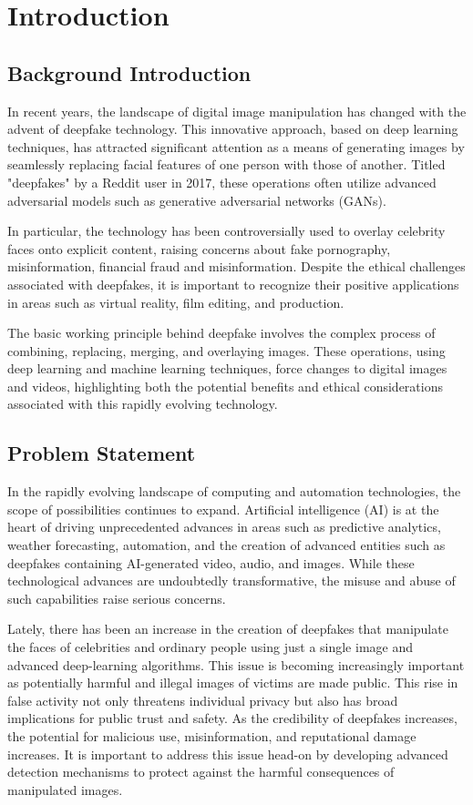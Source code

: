      \chapter{Introduction}
        \section{Background Introduction}
        In recent years, the landscape of digital image manipulation has changed with the advent of deepfake technology.
        This innovative approach, based on deep learning techniques, has attracted significant attention as a means of generating images by seamlessly replacing facial features of one person with those of another.
        Titled "deepfakes" by a Reddit user in 2017, these operations often utilize advanced adversarial models such as generative adversarial networks (GANs).

        In particular, the technology has been controversially used to overlay celebrity faces onto explicit content, raising concerns about fake pornography, misinformation, financial fraud and misinformation.
        Despite the ethical challenges associated with deepfakes, it is important to recognize their positive applications in areas such as virtual reality, film editing, and production.

        The basic working principle behind deepfake involves the complex process of combining, replacing, merging,  and overlaying images.
        These operations, using deep learning and machine learning techniques, force changes to digital images and videos, highlighting both the potential benefits and ethical considerations associated with this rapidly evolving technology.
        \section{Problem Statement}
        In the rapidly evolving landscape of computing and automation technologies, the scope of possibilities continues to expand.
        Artificial intelligence (AI) is at the heart of driving unprecedented advances in areas such as predictive analytics, weather forecasting, automation, and the creation of advanced entities such as deepfakes containing AI-generated video, audio, and images.
        While these technological advances are undoubtedly transformative, the misuse and abuse of such capabilities raise serious concerns.

        Lately, there has been an increase in the creation of deepfakes that manipulate the faces of celebrities and ordinary people using just a single image and advanced deep-learning algorithms.
        This issue is becoming increasingly important as potentially harmful and illegal images of victims are made public.
        This rise in false activity not only threatens individual privacy but also has broad implications for public trust and safety.
        As the credibility of deepfakes increases, the potential for malicious use, misinformation, and reputational damage increases.
        It is important to address this issue head-on by developing advanced detection mechanisms to protect against the harmful consequences of manipulated images.
        
